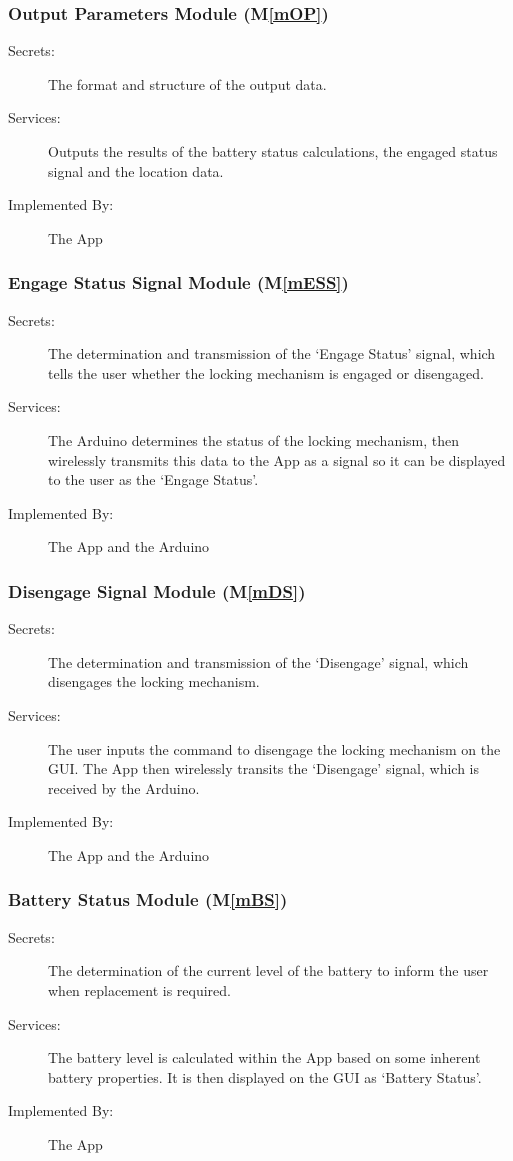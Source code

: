 \documentclass[12pt, titlepage]{article}
\newcommand{\mref}[1]{M\ref{#1}}
\begin{document}
\subsubsection{Output Parameters Module (\mref{mOP})}
\begin{description}
\item[Secrets:]The format and structure of the output data.
\item[Services:]Outputs the results of the battery status calculations, the engaged status signal and the location data. 
\item[Implemented By:]The App
\end{description}

\subsubsection{Engage Status Signal Module (\mref{mESS})}
\begin{description}
\item[Secrets:]The determination and transmission of the ‘Engage Status’ signal, which tells the user whether the locking mechanism is engaged or disengaged.
\item[Services:]The Arduino determines the status of the locking mechanism, then wirelessly transmits this data to the App as a signal so it can be displayed to the user as the ‘Engage Status’.
\item[Implemented By:]The App and the Arduino
\end{description}

\subsubsection{Disengage Signal Module (\mref{mDS})}
\begin{description}
\item[Secrets:]The determination and transmission of the ‘Disengage’ signal, which disengages the locking mechanism. 
\item[Services:]The user inputs the command to disengage the locking mechanism on the GUI. The App then wirelessly transits the ‘Disengage’ signal, which is received by the Arduino. 
\item[Implemented By:]The App and the Arduino
\end{description}

\subsubsection{Battery Status Module (\mref{mBS})}
\begin{description}
\item[Secrets:]The determination of the current level of the battery to inform the user when replacement is required.
\item[Services:]The battery level is calculated within the App based on some inherent battery properties. It is then displayed on the GUI as ‘Battery Status’. 
\item[Implemented By:]The App
\end{description}
\end{document}
